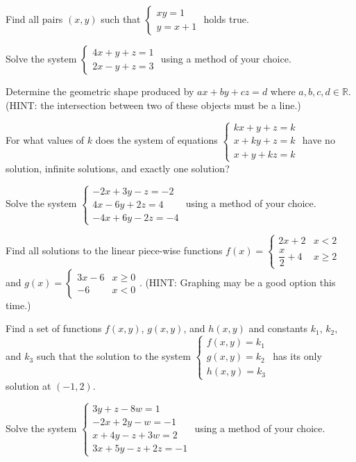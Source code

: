 \documentclass[lang=en,11pt]{elegantbook}
\begin{document}
\begin{reviewset}
\item Find all pairs $(x,y)$ such that $\begin{cases} xy=1 \\ y=x+1\end{cases}$ holds true.
\end{reviewset}
\begin{challengeset}
\item Solve the system $\begin{cases} 4x+y+z=1 \\ 2x-y+z=3 \end{cases}$ using a method of your choice.
\item Determine the geometric shape produced by $ax+by+cz=d$ where $a,b,c,d\in\mathbb{R}$.  (HINT: the intersection between two of these objects must be a line.)
\item For what values of $k$ does the system of equations $\begin{cases} kx+y+z=k \\ x+ky+z=k \\ x+y+kz=k \end{cases}$ have no solution, infinite solutions, and exactly one solution?
\item Solve the system $\begin{cases} -2x+3y-z=-2 \\ 4x-6y+2z=4 \\ -4x+6y-2z=-4\end{cases}$ using a method of your choice.
\item Find all solutions to the linear piece-wise functions $f(x)=\begin{cases} 2x+2 & x<2 \\ \dfrac{x}{2}+4 & x\geq 2 \end{cases}$ and $g(x)=\begin{cases} 3x-6 & x\geq 0 \\ -6 & x<0\end{cases}$.  (HINT: Graphing may be a good option this time.)
\item Find a set of functions $f(x,y)$, $g(x,y)$, and $h(x,y)$ and constants $k_1$, $k_2$, and $k_3$ such that the solution to the system $\begin{cases} f(x,y)=k_1 \\ g(x,y)=k_2 \\ h(x,y)=k_3 \end{cases}$ has its only solution at $(-1,2)$.
\item Solve the system $\begin{cases} 3y+z-8w=1 \\ -2x+2y-w=-1 \\ x+4y-z+3w=2 \\ 3x+5y-z+2z=-1 \end{cases}$ using a method of your choice.

\end{challengeset}
\end{document}
